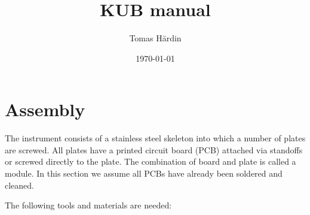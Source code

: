 \documentclass{article}
\begin{document}
\lstset{basicstyle=\ttfamily} %

\title{KUB manual}
\date{\today}
\author{Tomas H\"ardin}

\maketitle

\newpage

\tableofcontents
\listoffigures
\listoftables

\newpage

\section{Assembly}


The instrument consists of a stainless steel skeleton into which a number of plates are screwed.
All plates have a printed circuit board (PCB) attached via standoffs or screwed directly to the plate.
The combination of board and plate is called a module.
In this section we assume all PCBs have already been soldered and cleaned.

The following tools and materials are needed:
\end{document}
